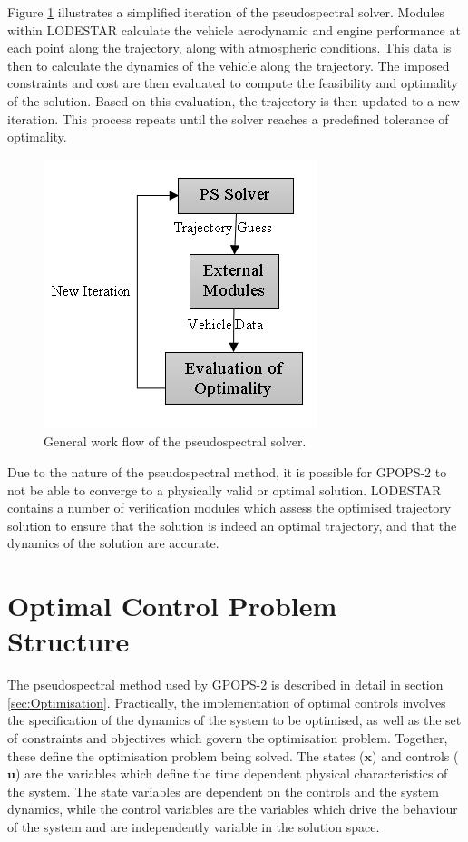 Figure \ref{fig:FlowChartSmall} illustrates a simplified iteration of the pseudospectral solver.
Modules within LODESTAR calculate the vehicle aerodynamic and engine performance at each point along the trajectory, along with atmospheric conditions. This data is then to calculate the dynamics of the vehicle along the trajectory. The imposed constraints and cost are then evaluated to compute the feasibility and optimality of the solution. Based on this evaluation, the trajectory is then updated to a new iteration. This process repeats until the solver reaches a predefined tolerance of optimality.
\begin{figure}[ht]
	\centering
	\includegraphics[width=0.5\linewidth]{figures/4_LODESTAR/FlowChartSmall}
	\caption{General work flow of the pseudospectral solver.}
	\label{fig:FlowChartSmall}
\end{figure}
Due to the nature of the pseudospectral method, it is possible for GPOPS-2 to not be able to converge to a physically valid or optimal solution. 
LODESTAR contains a number of verification modules which assess the optimised trajectory solution to ensure that the solution is indeed an optimal trajectory, and that the dynamics of the solution are accurate. 


\section{Optimal Control Problem Structure}

The pseudospectral method used by GPOPS-2 is described in detail in section \ref{sec:Optimisation}. Practically, the implementation of optimal controls involves the specification of the dynamics of the system to be optimised, as well as the set of constraints and objectives which govern the optimisation problem. 
 Together, these define the optimisation problem being solved. The states ($\mathbf{x}$) and controls ($\mathbf{u}$) are the variables which define the time dependent physical characteristics of the system. The state variables are dependent on the controls and the system dynamics, while the control variables are the variables which drive the behaviour of the system and are independently variable in the solution space.  




